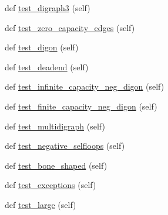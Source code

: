\begin{DoxyCompactItemize}
\item 
def \hyperlink{classnetworkx_1_1algorithms_1_1flow_1_1tests_1_1test__mincost_1_1TestMinCostFlow_a04a36485dfa787c1197cb9a93fb69d21}{test\+\_\+digraph3} (self)
\item 
def \hyperlink{classnetworkx_1_1algorithms_1_1flow_1_1tests_1_1test__mincost_1_1TestMinCostFlow_ac658db30c7effd7316c5394ee6b1484e}{test\+\_\+zero\+\_\+capacity\+\_\+edges} (self)
\item 
def \hyperlink{classnetworkx_1_1algorithms_1_1flow_1_1tests_1_1test__mincost_1_1TestMinCostFlow_a909b28d3b733f163dc1a923abddc5f18}{test\+\_\+digon} (self)
\item 
def \hyperlink{classnetworkx_1_1algorithms_1_1flow_1_1tests_1_1test__mincost_1_1TestMinCostFlow_a0c2a0e702de92e9e807afe24c8ab6000}{test\+\_\+deadend} (self)
\item 
def \hyperlink{classnetworkx_1_1algorithms_1_1flow_1_1tests_1_1test__mincost_1_1TestMinCostFlow_a6db0a6fbdd69eda5e03b5d46b83dcf30}{test\+\_\+infinite\+\_\+capacity\+\_\+neg\+\_\+digon} (self)
\item 
def \hyperlink{classnetworkx_1_1algorithms_1_1flow_1_1tests_1_1test__mincost_1_1TestMinCostFlow_addb2bb6e6431f40899d5c433703b454f}{test\+\_\+finite\+\_\+capacity\+\_\+neg\+\_\+digon} (self)
\item 
def \hyperlink{classnetworkx_1_1algorithms_1_1flow_1_1tests_1_1test__mincost_1_1TestMinCostFlow_a39c2b9b887bea19cfde8d5afe90aab0f}{test\+\_\+multidigraph} (self)
\item 
def \hyperlink{classnetworkx_1_1algorithms_1_1flow_1_1tests_1_1test__mincost_1_1TestMinCostFlow_ae89237578f61727c3ecd4aeeede7079b}{test\+\_\+negative\+\_\+selfloops} (self)
\item 
def \hyperlink{classnetworkx_1_1algorithms_1_1flow_1_1tests_1_1test__mincost_1_1TestMinCostFlow_adb363feb35cd24482644fa2b2b4f0783}{test\+\_\+bone\+\_\+shaped} (self)
\item 
def \hyperlink{classnetworkx_1_1algorithms_1_1flow_1_1tests_1_1test__mincost_1_1TestMinCostFlow_ab3b4ed9e56cbdc8be32eebed7e1d6b9d}{test\+\_\+exceptions} (self)
\item 
def \hyperlink{classnetworkx_1_1algorithms_1_1flow_1_1tests_1_1test__mincost_1_1TestMinCostFlow_a3f9cb5f9645f21e6754acc0597669f0b}{test\+\_\+large} (self)
\end{DoxyCompactItemize}


